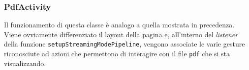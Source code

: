 \subsubsection{PdfActivity}
Il funzionamento di questa classe è analogo a quella mostrata in precedenza. Viene ovviamente differenziato il layout della pagina e, all'interno del \textit{listener} della funzione \texttt{setupStreamingModePipeline}, vengono associate le varie gesture riconosciute ad azioni che permettono di interagire con il file \texttt{pdf} che si sta visualizzando.